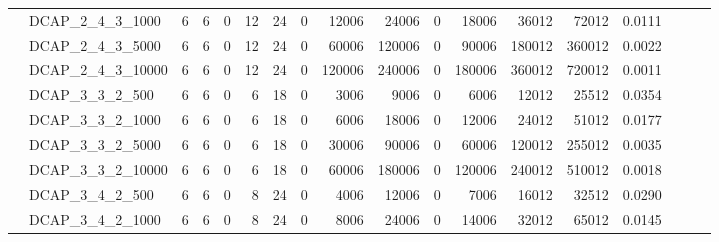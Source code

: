 \begin{table}[h]
{\begin{tabular}{llrrrrrrrrrrrrrlll}
			& DCAP\_2\_4\_3\_1000          & 6            & 6           & 0          & 12           & 24          & 0          & 12006   & 24006    & 0      & 18006   & 36012    & 72012      & 0.0111    &                          &                          &                          \\
			& DCAP\_2\_4\_3\_5000          & 6            & 6           & 0          & 12           & 24          & 0          & 60006   & 120006   & 0      & 90006   & 180012   & 360012     & 0.0022    &                          &                          &                          \\
			& DCAP\_2\_4\_3\_10000         & 6            & 6           & 0          & 12           & 24          & 0          & 120006  & 240006   & 0      & 180006  & 360012   & 720012     & 0.0011    &                          &                          &                          \\
			& DCAP\_3\_3\_2\_500           & 6            & 6           & 0          & 6            & 18          & 0          & 3006    & 9006     & 0      & 6006    & 12012    & 25512      & 0.0354    &                          &                          &                          \\
			& DCAP\_3\_3\_2\_1000          & 6            & 6           & 0          & 6            & 18          & 0          & 6006    & 18006    & 0      & 12006   & 24012    & 51012      & 0.0177    &                          &                          &                          \\
			& DCAP\_3\_3\_2\_5000          & 6            & 6           & 0          & 6            & 18          & 0          & 30006   & 90006    & 0      & 60006   & 120012   & 255012     & 0.0035    &                          &                          &                          \\
			& DCAP\_3\_3\_2\_10000         & 6            & 6           & 0          & 6            & 18          & 0          & 60006   & 180006   & 0      & 120006  & 240012   & 510012     & 0.0018    &                          &                          &                          \\
			& DCAP\_3\_4\_2\_500           & 6            & 6           & 0          & 8            & 24          & 0          & 4006    & 12006    & 0      & 7006    & 16012    & 32512      & 0.0290    &                          &                          &                          \\
			& DCAP\_3\_4\_2\_1000          & 6            & 6           & 0          & 8            & 24          & 0          & 8006    & 24006    & 0      & 14006   & 32012    & 65012      & 0.0145    &                          &                          &                          \\

\end{tabular}}
\end{table}
